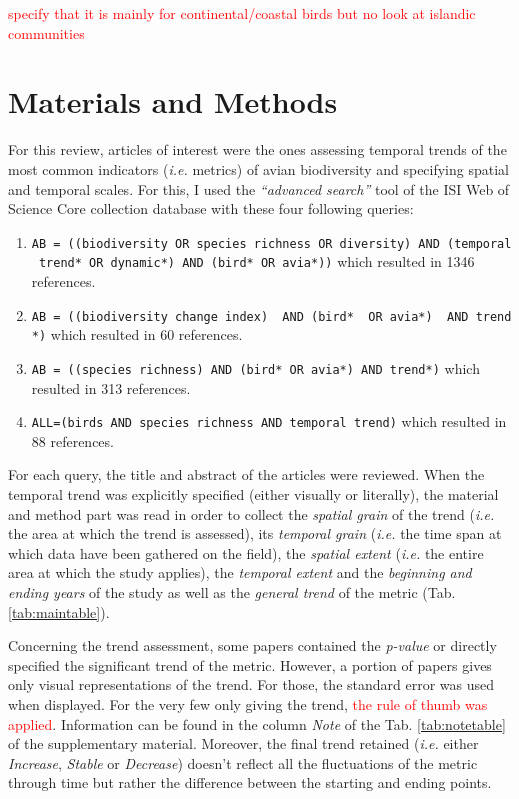\documentclass[
  12pt,
  oneside]{report}
\begin{document}
\textcolor{red}{specify that it is mainly for continental/coastal birds but no look at  islandic communities}

\hypertarget{materials-and-methods}{%
\chapter{Materials and Methods}\label{materials-and-methods}}

For this review, articles of interest were the ones assessing temporal trends of the most common indicators (\emph{i.e.} metrics) of avian biodiversity and specifying spatial and temporal scales. For this, I used the \emph{``advanced search''} tool of the ISI Web of Science Core collection database with these four following queries:

\begin{enumerate}
\def\labelenumi{\arabic{enumi}.}
\item
  \texttt{AB\ =\ ((biodiversity\ OR\ species\ richness\ OR\ diversity)\ AND\ (temporal\ trend*\ OR\ dynamic*)\ AND\ (bird*\ OR\ avia*))} which resulted in 1346 references.
\item
  \texttt{AB\ =\ ((biodiversity\ change\ index)\ \ AND\ (bird*\ \ OR\ avia*)\ \ AND\ trend*)} which resulted in 60 references.
\item
  \texttt{AB\ =\ ((species\ richness)\ AND\ (bird*\ OR\ avia*)\ AND\ trend*)} which resulted in 313 references.
\item
  \texttt{ALL=(birds\ AND\ species\ richness\ AND\ temporal\ trend)} which resulted in 88 references.
\end{enumerate}

For each query, the title and abstract of the articles were reviewed. When the temporal trend was explicitly specified (either visually or literally), the material and method part was read in order to collect the \emph{spatial grain} of the trend (\emph{i.e.} the area at which the trend is assessed), its \emph{temporal grain} (\emph{i.e.} the time span at which data have been gathered on the field), the \emph{spatial extent} (\emph{i.e.} the entire area at which the study applies), the \emph{temporal extent} and the \emph{beginning and ending years} of the study as well as the \emph{general trend} of the metric (Tab. \ref{tab:maintable}).

Concerning the trend assessment, some papers contained the \emph{p-value} or directly specified the significant trend of the metric. However, a portion of papers gives only visual representations of the trend. For those, the standard error was used when displayed. For the very few only giving the trend, \textcolor{red}{the rule of thumb was applied}. Information can be found in the column \emph{Note} of the Tab. \ref{tab:notetable} of the supplementary material. Moreover, the final trend retained (\emph{i.e.} either \emph{Increase}, \emph{Stable} or \emph{Decrease}) doesn't reflect all the fluctuations of the metric through time but rather the difference between the starting and ending points.
\end{document}
